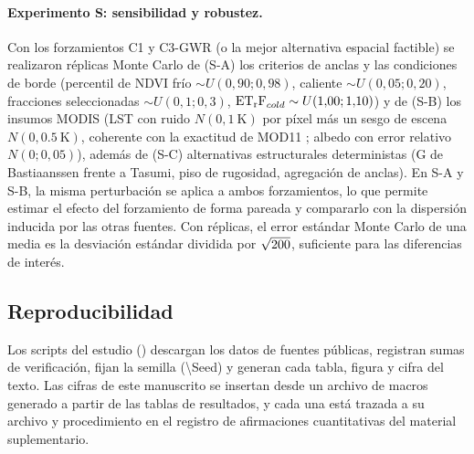 \paragraph{Experimento S: sensibilidad y robustez.} Con los forzamientos C1
y C3-GWR (o la mejor alternativa espacial factible) se realizaron
\NMC{} réplicas Monte Carlo de (S-A) los criterios de anclas y las
condiciones de borde (percentil de NDVI frío $\sim U(0{,}90;0{,}98)$, caliente
$\sim U(0{,}05;0{,}20)$, fracciones seleccionadas $\sim U(0{,}1;0{,}3)$,
$\mathrm{ET_rF}_{cold}\sim U(1{,}00;1{,}10)$) y de (S-B) los insumos MODIS (LST con
ruido $N(0,\SI{1}{\kelvin})$ por píxel más un sesgo de escena
$N(0,\SI{0,5}{\kelvin})$, coherente con la exactitud de MOD11
\parencite{wan2014mod11c6}; albedo con error relativo $N(0;0{,}05)$), además
de (S-C) alternativas estructurales deterministas (G de Bastiaanssen frente
a Tasumi, piso de rugosidad, agregación de anclas). En S-A y S-B, la misma
perturbación se aplica a ambos forzamientos, lo que permite estimar el
efecto del forzamiento de forma pareada y compararlo con la dispersión
inducida por las otras fuentes. Con \NMC{} réplicas, el error estándar
Monte Carlo de una media es la desviación estándar dividida por
$\sqrt{200}$, suficiente para las diferencias de interés.

\subsection{Reproducibilidad}

Los scripts del estudio () descargan los
datos de fuentes públicas, registran sumas de verificación, fijan la
semilla (\num[group-separator={}]{\Seed}) y generan cada tabla, figura y
cifra del texto. Las cifras de este manuscrito se insertan desde un
archivo de macros generado a partir de las tablas de resultados, y cada una
está trazada a su archivo y procedimiento en el registro de afirmaciones
cuantitativas del material suplementario.
